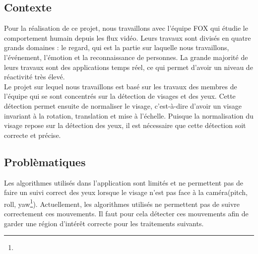 


\subsection{Contexte}
Pour la réalisation de ce projet, nous travaillons avec l'équipe FOX qui étudie
le comportement humain depuis les flux vidéo. Leurs travaux sont
divisés en quatre grands domaines : le regard, qui est la partie sur laquelle nous travaillons, l'événement, l'émotion et la
reconnaissance de personnes. La grande majorité de leurs travaux sont
des applications temps réel, ce qui permet d'avoir un niveau de réactivité très élevé.\\ 

Le projet sur lequel nous travaillons est basé sur les travaux des membres de l'équipe qui se sont concentrés sur la
détection de visages et des yeux. Cette détection permet ensuite de normaliser le visage, c'est-à-dire
d'avoir un visage invariant à la rotation, translation et mise à l'échelle.
Puisque la normalisation du visage repose sur la détection des yeux, il est nécessaire que cette 
détection soit correcte et précise. \\

\subsection{Problèmatiques}
Les algorithmes utilisés dans l'application sont limités et ne permettent pas de faire un suivi correct des yeux 
lorsque le visage n'est pas face à la caméra(pitch, roll, yaw\footnote{}). Actuellement, les algorithmes utilisés ne permettent pas
de suivre correctement ces mouvements. Il faut pour cela détecter
ces mouvements afin de garder une région d'intérêt correcte pour les traitements suivants.\\

